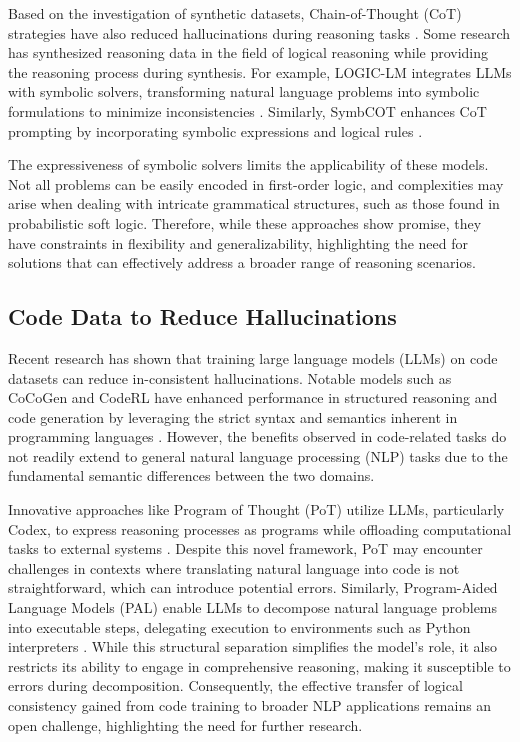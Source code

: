 Based on the investigation of synthetic datasets, Chain-of-Thought (CoT) strategies have also reduced hallucinations during reasoning tasks \cite{wei2022chain}. Some research has synthesized reasoning data in the field of logical reasoning \cite{nie2020adversarial,saeed2021rulebert} while providing the reasoning process \cite{dalvi2021explaining} during synthesis. For example, LOGIC-LM integrates LLMs with symbolic solvers, transforming natural language problems into symbolic formulations to minimize inconsistencies \cite{pan2023logic}. Similarly, SymbCOT enhances CoT prompting by incorporating symbolic expressions and logical rules \cite{xu2024faithful}.


The expressiveness of symbolic solvers limits the applicability of these models. Not all problems can be easily encoded in first-order logic, and complexities may arise when dealing with intricate grammatical structures, such as those found in probabilistic soft logic. Therefore, while these approaches show promise, they have constraints in flexibility and generalizability, highlighting the need for solutions that can effectively address a broader range of reasoning scenarios.


\subsection{Code Data to Reduce Hallucinations}


Recent research has shown that training large language models (LLMs) on code datasets can reduce in-consistent hallucinations. Notable models such as CoCoGen and CodeRL have enhanced performance in structured reasoning and code generation by leveraging the strict syntax and semantics inherent in programming languages \cite{madaan2022language,le2022coderl}. However, the benefits observed in code-related tasks do not readily extend to general natural language processing (NLP) tasks due to the fundamental semantic differences between the two domains.


Innovative approaches like Program of Thought (PoT) utilize LLMs, particularly Codex, to express reasoning processes as programs while offloading computational tasks to external systems \cite{chenprogram}. Despite this novel framework, PoT may encounter challenges in contexts where translating natural language into code is not straightforward, which can introduce potential errors. Similarly, Program-Aided Language Models (PAL) enable LLMs to decompose natural language problems into executable steps, delegating execution to environments such as Python interpreters \cite{gao2023pal}. While this structural separation simplifies the model's role, it also restricts its ability to engage in comprehensive reasoning, making it susceptible to errors during decomposition. Consequently, the effective transfer of logical consistency gained from code training to broader NLP applications remains an open challenge, highlighting the need for further research.






